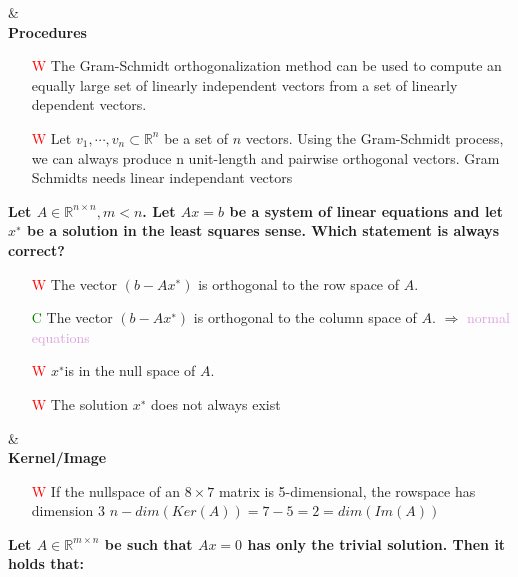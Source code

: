 \documentclass[7pt,landscape, margin = 0.1mm]{article}
\begin{document}
\begin{multicols}{4}
\begin{flushleft}
\begin{itemize}
\end{itemize}

\hspace{3mm}
\hline & \\[3mm]
\scriptsize
\textbf{Procedures}
\tiny \\
\begin{itemize}
\item[\textcolor{red}{W}]  The Gram-Schmidt orthogonalization method can be used to compute an equally large set of linearly
independent vectors from a set of linearly dependent vectors.
\item[\textcolor{red}{W}] Let ${v_1, \cdots , v_n} \subset \mathbb{R}^n$ be a set of $ n$ vectors. Using the Gram-Schmidt process, we can always
produce n unit-length and pairwise orthogonal vectors.
\textcolor{Emerald}{Gram Schmidts needs linear independant vectors}
\end{itemize}
\hspace{3mm}

\textbf{Let $A  \in \mathbb{R}^{n \times n}, m<n $. Let $Ax = b$ be a system of linear equations and let $x^∗$ be a solution in the
least squares sense. Which statement is always correct?  }
\begin{itemize}
\item[\textcolor{red}{W}] The vector $(b − Ax^∗)$ is orthogonal to the row space of $A$.
\item[\textcolor{green}{C}] The vector $(b − Ax^∗) $ is orthogonal to the column space of $A$.
\textcolor{Emerald}{$\Rightarrow$ \textcolor{Plum}{normal equations}}
\item[\textcolor{red}{W}] $x^∗ $is in the null space of $ A$.
\item[\textcolor{red}{W}] The solution $x^∗$ does not always exist
\end{itemize}

\hspace{3mm}
\hline & \\[3mm]
\scriptsize
\textbf{Kernel/Image}
\tiny \\
\hspace{3mm}

\begin{itemize}
\item[\textcolor{red}{W}]  If the nullspace of an $8 \times 7$ matrix is 5-dimensional, the rowspace has dimension 3
\textcolor{Emerald}{$n-dim(Ker(A))=7-5=2 = dim(Im(A))$}
\end{itemize}
\textbf{ Let $A  \in \mathbb{R}^{m \times n} $ be such that $Ax = 0$ has only the trivial solution. Then it holds that:  }
\begin{itemize}
 

\end{itemize}
\end{flushleft}
\end{multicols}
\end{document}
